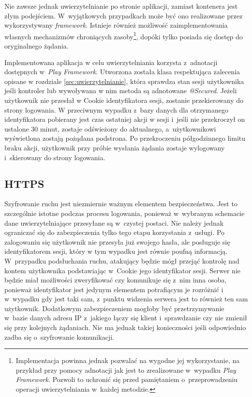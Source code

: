 \documentclass[11pt]{aghdpl}
\begin{document}
Nie zawsze jednak uwierzytelnianie po stronie aplikacji, zamiast kontenera jest złym podejściem. W~wyjątkowych przypadkach może być ono realizowane przez wykorzystywany \emph{framework}. Istnieje również możliwość zaimplementowania własnych mechanizmów chroniących zasoby\footnote{Implementacja powinna jednak pozwalać na wygodne jej wykorzystanie, na przykład przy pomocy adnotacji jak jest to zrealizowane w~wypadku \emph{Play Framework}. Pozwoli to uchronić się przed pamiętaniem o~przeprowadzeniu operacji uwierzytelniania w~każdej metodzie.}, dopóki tylko posiada się dostęp do oryginalnego żądania.

Implementowana aplikacja w celu uwierzytelniania korzysta z~adnotacji dostępnych w~\emph{Play Framework}. Utworzona została klasa respektująca zalecenia opisane w rozdziale \ref{sec:uwierzytelnianie}, która sprawdza stan sesji użytkownika jeśli kontroler lub wywoływana w nim metoda są adnotowane \emph{@Secured}. Jeżeli użytkownik nie przesłał w Cookie identyfikatora sesji, zostanie przekierowany do strony logowania. W przeciwnym wypadku z~bazy danych dla otrzymanego identyfikatora pobierany jest czas ostatniej akcji w sesji i~jeśli nie przekroczył on ustalone 30 minut, zostaje odświeżony do aktualnego, a~użytkownikowi wyświetlona zostają pożądana podstrona. Po przekroczeniu półgodzinnego limitu braku akcji, użytkownik przy próbie wysłania żądania zostaje wylogowany i~skierowany do strony logowania.
 
\subsection{HTTPS}
\label{sec:https}

Szyfrowanie ruchu jest niezmiernie ważnym elementem bezpieczeństwa. Jest to szczególnie istotne podczas procesu logowania, ponieważ w~wybranym schemacie dane uwierzytelniające przesyłane są w~czystej postaci. Nie należy jednak ograniczać się do zabezpieczenia tylko tego etapu korzystania z~usługi. Po zalogowaniu się użytkownik nie przesyła już swojego hasła, ale posługuje się identyfikatorem sesji, który w tym wypadku jest równie poufną informacją. W~przypadku podsłuchania ruchu, atakujący będzie mógł przejąć kontrolę nad kontem użytkownika podstawiając w~Cookie jego identyfikator sesji. Serwer nie będzie miał możliwości zweryfikować czy komunikuje się z~nim inna osoba, ponieważ identyfikator jest jedynym elementem potrafiącym je rozróżnić i w~wypadku gdy jest taki sam, z~punktu widzenia serwera jest to również ten sam użytkownik. Dodatkowym zabezpieczeniem mogłoby być przetrzymywanie w~bazie danych adresu IP z~jakiego łączy się klient i~sprawdzanie czy nie zmienił się przy kolejnych żądaniach. Nie ma jednak takiej konieczności jeśli odpowiednio zadba się o~szyfrowanie komunikacji. 
\end{document}
